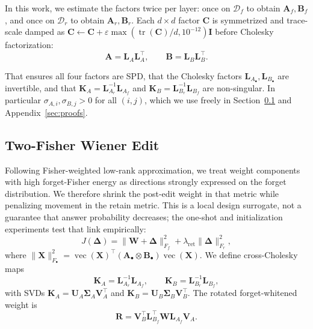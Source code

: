 \documentclass[11pt]{article}
\begin{document}
In this work, we estimate the factors twice per layer: once on $\mathcal{D}_f$ to obtain $\mathbf{A}_f, \mathbf{B}_f$, and once on $\mathcal{D}_r$ to obtain $\mathbf{A}_r, \mathbf{B}_r$. Each $d\times d$ factor $\mathbf{C}$ is symmetrized and trace-scale damped as $\mathbf{C}\leftarrow\mathbf{C}+\varepsilon\max(\operatorname{tr}(\mathbf{C})/d,10^{-12})\mathbf{I}$ before Cholesky factorization:
\begin{equation}
    \mathbf{A} = \mathbf{L}_A \mathbf{L}_A^\top, \qquad \mathbf{B} = \mathbf{L}_B \mathbf{L}_B^\top.
\end{equation}

That ensures all four factors are SPD, that the Cholesky factors $\mathbf{L}_{A_\bullet},\mathbf{L}_{B_\bullet}$ are invertible, and that $\mathbf{K}_A=\mathbf{L}_{A_r}^{-1}\mathbf{L}_{A_f}$ and $\mathbf{K}_B=\mathbf{L}_{B_r}^{-1}\mathbf{L}_{B_f}$ are non-singular. In particular $\sigma_{A,i},\sigma_{B,j}>0$ for all $(i,j)$, which we use freely in Section~\ref{sec:two_fisher_gsvd} and Appendix~\ref{sec:proofs}.

\subsection{Two-Fisher Wiener Edit}
\label{sec:two_fisher_gsvd}

Following Fisher-weighted low-rank approximation, we treat weight components with high forget-Fisher energy as directions strongly expressed on the forget distribution. We therefore shrink the post-edit weight in that metric while penalizing movement in the retain metric. This is a local design surrogate, not a guarantee that answer probability decreases; the one-shot and initialization experiments test that link empirically:
\begin{equation}
    J(\mathbf{\Delta})
    =
    \lVert \mathbf{W}+\mathbf{\Delta} \rVert^2_{F_f}
    +
    \lambda_{\mathrm{ret}}
    \lVert \mathbf{\Delta} \rVert^2_{F_r},
\label{eq:kforge_objective}
\end{equation}
where $\lVert \mathbf{X} \rVert^2_{F_\bullet}
= \operatorname{vec}(\mathbf{X})^\top
(\mathbf{A}_\bullet \otimes \mathbf{B}_\bullet)
\operatorname{vec}(\mathbf{X})$. We define cross-Cholesky maps
\begin{equation}
    \mathbf{K}_A = \mathbf{L}_{A_r}^{-1}\mathbf{L}_{A_f},
    \qquad
    \mathbf{K}_B = \mathbf{L}_{B_r}^{-1}\mathbf{L}_{B_f},
\end{equation}
with SVDs $\mathbf{K}_A = \mathbf{U}_A \mathbf{\Sigma}_A \mathbf{V}_A^\top$ and
$\mathbf{K}_B = \mathbf{U}_B \mathbf{\Sigma}_B \mathbf{V}_B^\top$. The rotated forget-whitened weight is
\begin{equation}
    \mathbf{R}
    =
    \mathbf{V}_B^\top
    \mathbf{L}_{B_f}^\top
    \mathbf{W}
    \mathbf{L}_{A_f}
    \mathbf{V}_A.
\end{equation}
\end{document}
